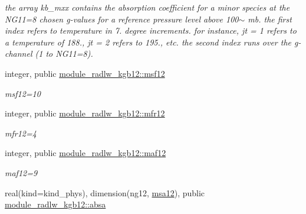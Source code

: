 \begin{DoxyCompactItemize}
\begin{DoxyCompactList}\small\item\em the array kb\+\_\+mxx contains the absorption coefficient for a minor species at the N\+G11=8 chosen g-\/values for a reference pressure level above 100$\sim$ mb. the first index refers to temperature in 7. degree increments. for instance, jt = 1 refers to a temperature of 188., jt = 2 refers to 195., etc. the second index runs over the g-\/channel (1 to N\+G11=8). \end{DoxyCompactList}\item 
\mbox{\label{group__module__radlw__kgbnn_ga3282a15ee0faaafd65509536a59e5b4f}} 
integer, public \hyperlink{group__module__radlw__kgbnn_ga3282a15ee0faaafd65509536a59e5b4f}{module\+\_\+radlw\+\_\+kgb12\+::msf12}
\begin{DoxyCompactList}\small\item\em msf12=10 \end{DoxyCompactList}\item 
\mbox{\label{group__module__radlw__kgbnn_gacd751a2e48d0286e3d25a9b658a8367a}} 
integer, public \hyperlink{group__module__radlw__kgbnn_gacd751a2e48d0286e3d25a9b658a8367a}{module\+\_\+radlw\+\_\+kgb12\+::mfr12}
\begin{DoxyCompactList}\small\item\em mfr12=4 \end{DoxyCompactList}\item 
\mbox{\label{group__module__radlw__kgbnn_ga9d7c05182e21605108bd65f47bb5569c}} 
integer, public \hyperlink{group__module__radlw__kgbnn_ga9d7c05182e21605108bd65f47bb5569c}{module\+\_\+radlw\+\_\+kgb12\+::maf12}
\begin{DoxyCompactList}\small\item\em maf12=9 \end{DoxyCompactList}\item 
\mbox{\label{group__module__radlw__kgbnn_ga7600bfa19dde3b47d8479f5766ee0c93}} 
real(kind=kind\+\_\+phys), dimension(ng12, \hyperlink{namespacemodule__radlw__kgb12_ad1ddd94fe11b11485502d1fe6f5a1615}{msa12}), public \hyperlink{group__module__radlw__kgbnn_ga7600bfa19dde3b47d8479f5766ee0c93}{module\+\_\+radlw\+\_\+kgb12\+::absa}

\end{DoxyCompactItemize}
